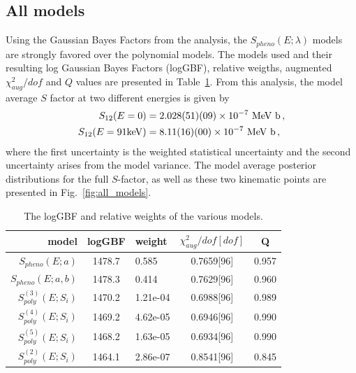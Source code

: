 \documentclass[prd,11pt,superscriptaddress,notitlepage,tightenlines,nofootinbib,floatfix]{revtex4-1}
\begin{document}
\subsection{All models}
Using the Gaussian Bayes Factors from the analysis, the $S_{pheno}(E;\lambda)$ models are strongly favored over the polynomial models.
The models used and their resulting log Gaussian Bayes Factors (logGBF), relative weigths, augmented $\chi^2_{aug}/dof$ and $Q$ values are presented in Table~\ref{tab:all_models}.
From this analysis, the model average $S$ factor at two different energies is given by
\begin{align}
S_{12}(E=0) &= 2.028(51)(09)\times10^{-7} \textrm{ MeV b}\, ,
\nonumber\\
S_{12}(E=91{\rm keV}) &= 8.11(16)(00)\times10^{-7} \textrm{ MeV b}\, ,
\end{align}
where the first uncertainty is the weighted statistical uncertainty and the second uncertainty arises from the model variance.
The model average posterior distributions for the full $S$-factor, as well as these two kinematic points are presented in Fig.~\ref{fig:all_models}.

\begin{table}
\begin{ruledtabular}
\begin{tabular}{rclcc}
model& logGBF& weight& $\chi_{aug}^2/dof[dof]$& Q\\
\hline
$S_{pheno}(E; a)$       & 1478.7 & 0.585    & 0.7659[96] & 0.957\\
$S_{pheno}(E; a, b)$    & 1478.3 & 0.414    & 0.7629[96] & 0.960\\
$S_{poly}^{(3)}(E; S_i)$& 1470.2 & 1.21e-04 & 0.6988[96] & 0.989\\
$S_{poly}^{(4)}(E; S_i)$& 1469.2 & 4.62e-05 & 0.6946[96] & 0.990\\
$S_{poly}^{(5)}(E; S_i)$& 1468.2 & 1.63e-05 & 0.6934[96] & 0.990\\
$S_{poly}^{(2)}(E; S_i)$& 1464.1 & 2.86e-07 & 0.8541[96] & 0.845\\
\end{tabular}
\end{ruledtabular}
\caption{\label{tab:all_models}
The logGBF and relative weights of the various models.
}
\end{table}
\end{document}
